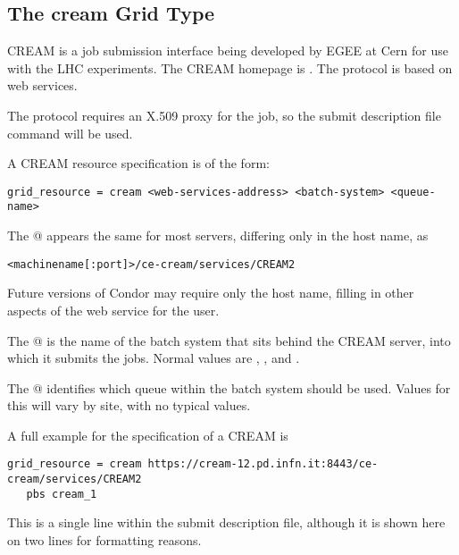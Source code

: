 
\subsection{\label{sec:CREAM}The cream Grid Type }

CREAM is a job submission interface being developed by EGEE at Cern 
for use with the LHC experiments.
The CREAM homepage is .
The protocol is based on web services.

The protocol requires an X.509 proxy for the job,
so the submit description file command 
will be used.

A CREAM resource specification is of the form:
\footnotesize
\begin{verbatim}
grid_resource = cream <web-services-address> <batch-system> <queue-name>
\end{verbatim}
\normalsize
The @ appears the same for most servers,
differing only in the host name, as
\begin{verbatim}
<machinename[:port]>/ce-cream/services/CREAM2
\end{verbatim}
Future versions of Condor may require only the host name, 
filling in other aspects of the web service for the user.

The @ is the name of the batch system that sits behind
the CREAM server,
into which it submits the jobs.
Normal values are \verb@pbs@, \verb@lsf@, and \verb@condor@.

The @ identifies which queue within the batch system
should be used.
Values for this will vary by site, with no typical values.

A full example for the specification of a CREAM  is
\footnotesize
\begin{verbatim}
grid_resource = cream https://cream-12.pd.infn.it:8443/ce-cream/services/CREAM2
   pbs cream_1
\end{verbatim}
\normalsize
This is a single line within the submit description file,
although it is shown here on two lines for formatting reasons.


